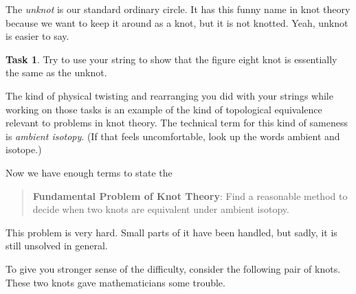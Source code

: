 \documentclass[12pt,letterpaper]{article}
\theoremstyle{definition}
\newtheorem{task}[question]{Task}
\begin{document}
The \emph{unknot} is our standard ordinary circle.
It has this funny name in knot theory because we want to keep it around as a knot, but it is not knotted.
Yeah, unknot is easier to say.

\begin{task}
Try to use your string to show that the figure eight knot is essentially the same as the unknot.
\end{task}

The kind of physical twisting and rearranging you did with your strings while working on those tasks is an example of the kind of topological equivalence relevant to problems in knot theory. The technical term for this kind of sameness is \emph{ambient isotopy}. (If that feels uncomfortable, look up the words ambient and isotope.)

Now we have enough terms to state the 
\begin{quote}
\textbf{Fundamental Problem of Knot Theory}: Find a reasonable method to decide when two knots are equivalent under ambient isotopy.
\end{quote}

This problem is very hard.
Small parts of it have been handled, but sadly, it is still unsolved in general.

To give you stronger sense of the difficulty, consider the following pair of knots. These two knots gave mathematicians some trouble.
\end{document}
